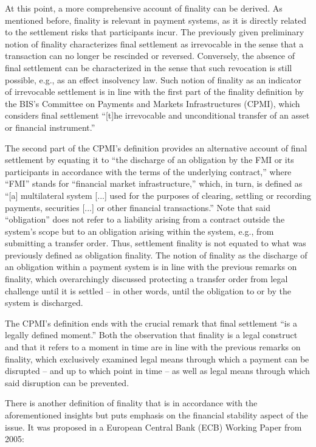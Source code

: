 At this point, a more comprehensive account of finality can be derived.
As mentioned before, finality is relevant in payment systems, as it is directly related to the settlement risks that participants incur.
The previously given preliminary notion of finality characterizes final settlement as irrevocable in the sense that a transaction can no longer be rescinded or reversed.
Conversely, the absence of final settlement can be characterized in the sense that such revocation is still possible, e.g., as an effect insolvency law.
Such notion of finality as an indicator of irrevocable settlement is in line with the first part of the finality definition by the BIS's  Committee on Payments and Markets Infrastructures (CPMI), which considers final settlement ``[t]he irrevocable and unconditional transfer of an asset or financial instrument.'' \autocite[8]{bis2016cpmiglossary}

The second part of the CPMI's definition provides an alternative account of final settlement by equating it to ``the discharge of an obligation by the FMI or its participants in accordance with the terms of the underlying contract,'' where ``FMI'' stands for ``financial market infrastructure,'' which, in turn, is defined as ``[a] multilateral system [...] used for the purposes of clearing, settling or recording payments, securities [...] or other financial transactions.'' \autocite[8]{bis2016cpmiglossary}
Note that said ``obligation'' does not refer to a liability arising from a contract outside the system's scope but to an obligation arising within the system, e.g., from submitting a transfer order.
Thus, settlement finality is not equated to what was previously defined as obligation finality.
The notion of finality as the discharge of an obligation within a payment system is in line with the previous remarks on finality, which overarchingly discussed protecting a transfer order from legal challenge until it is settled -- in other words, until the obligation to or by the system is discharged.

The CPMI's definition ends with the crucial remark that final settlement ``is a legally defined moment.'' \autocite[8]{bis2016cpmiglossary}
Both the observation that finality is a legal construct and that it refers to a moment in time are in line with the previous remarks on finality, which exclusively examined legal means through which a payment can be disrupted -- and up to which point in time -- as well as legal means through which said disruption can be prevented.

There is another definition of finality that is in accordance with the aforementioned insights but puts emphasis on the financial stability aspect of the issue. It was proposed in a European Central Bank (ECB) Working Paper from 2005: \autocite[6]{pages2005}

